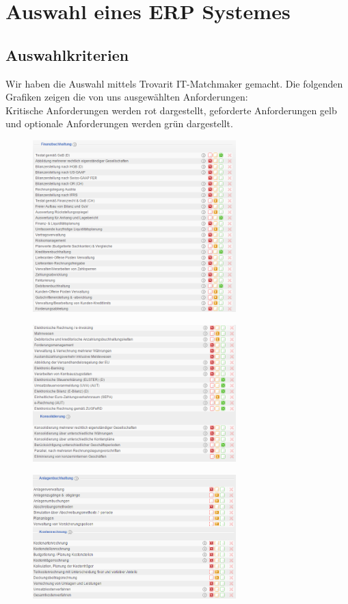 \documentclass[12pt]{article}
\begin{document}
\section{Auswahl eines ERP Systemes}
\subsection{Auswahlkriterien}
Wir haben die Auswahl mittels Trovarit IT-Matchmaker gemacht. Die folgenden Grafiken zeigen die von uns ausgewählten Anforderungen: \\
Kritische Anforderungen werden rot dargestellt, geforderte Anforderungen gelb und optionale Anforderungen werden grün dargestellt.
\begin{figure}[here!]
\centering
\includegraphics[width=0.7\textwidth]{images/tr1}
\end{figure}\FloatBarrier
\noindent
\begin{figure}[here!]
\centering
\includegraphics[width=0.7\textwidth]{images/tr2}
\end{figure}\FloatBarrier
\noindent
\begin{figure}[here!]
\centering
\includegraphics[width=0.7\textwidth]{images/tr3}
\end{figure}\FloatBarrier
\end{document}
